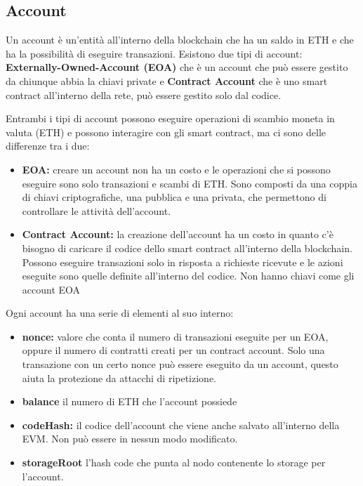 \subsection{Account}
Un account è un'entità all'interno della blockchain che ha un saldo in ETH e
che ha la possibilità di eseguire transazioni. Esistono due tipi di account:
\textbf{Externally-Owned-Account (EOA)} che è un account che può essere gestito
da chiunque abbia la chiavi private e \textbf{Contract Account} che è uno smart
contract all'interno della rete, può essere gestito solo dal codice.

Entrambi i tipi di account possono eseguire operazioni di scambio moneta 
in valuta (ETH) e possono interagire con gli smart contract, ma ci sono delle 
differenze tra i due:

\begin{itemize}
    \item \textbf{EOA:} creare un account non ha un costo e le operazioni che 
        si possono eseguire sono solo transazioni e scambi di ETH. Sono 
        composti da una coppia di chiavi criptografiche, una 
        pubblica e una privata, che permettono di controllare le attività
        dell'account.
    \item \textbf{Contract Account:} la creazione dell'account ha un costo
        in quanto c'è bisogno di caricare il codice dello smart contract
        all'interno della blockchain. Possono eseguire transazioni solo in 
        risposta a richieste ricevute e le azioni eseguite sono quelle definite
        all'interno del codice. Non hanno chiavi come gli account EOA
\end{itemize}

Ogni account ha una serie di elementi al suo interno:
\begin{itemize}
    \item \textbf{nonce:} valore che conta il numero di transazioni eseguite
        per un EOA, oppure il numero di contratti creati per un contract
        account. Solo una transazione con un certo nonce può essere eseguito
        da un account, questo aiuta la protezione da attacchi di ripetizione.
    \item \textbf{balance} il numero di ETH che l'account possiede
    \item \textbf{codeHash:} il codice dell'account che viene anche salvato 
        all'interno della EVM. Non può essere in nessun modo modificato.
    \item \textbf{storageRoot} l'hash code che punta al nodo contenente lo 
        storage per l'account.
\end{itemize}

